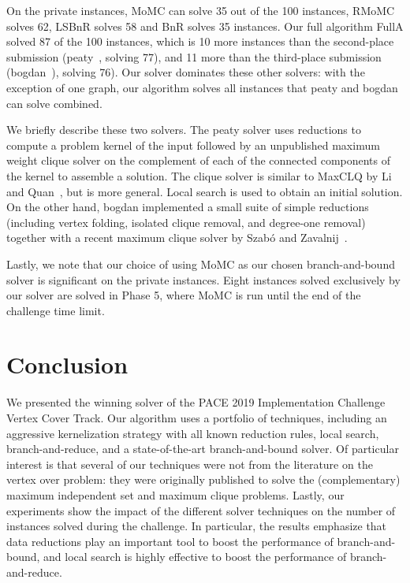 \documentclass[twoside,leqno,twocolumn]{article}
\newcommand{\AlgName}[1]{\textsf{#1}}
\begin{document}
On the private instances, \AlgName{MoMC} can solve 35 out of the 100 instances, \AlgName{RMoMC} solves 62, \AlgName{LSBnR} solves 58 and \AlgName{BnR} solves 35 instances.
Our full algorithm \AlgName{FullA} solved 87 of the 100 instances, which is 10 more instances than the second-place submission (\textsf{peaty}~\cite{james_trimble_2019_3082356}, solving 77), and 11 more than the third-place submission (\textsf{bogdan}~\cite{zbogdan_2019_3228802}), solving 76). Our solver dominates these other solvers: with the exception of one graph, our algorithm solves all instances that \textsf{peaty} and \textsf{bogdan} can solve combined. 

We briefly describe these two solvers. The \textsf{peaty} solver uses reductions to compute a problem kernel of the input followed by an unpublished maximum weight clique solver on the complement of each of the connected components of the kernel to assemble a solution. The clique solver is similar to MaxCLQ by Li and Quan~\cite{DBLP:conf/aaai/LiQ10}, but is more general. Local search is used to obtain an initial solution. On the other hand, \textsf{bogdan} implemented a small suite of simple reductions (including vertex folding, isolated clique removal, and degree-one removal) together with a recent maximum clique solver by Szab\'o and Zavalnij~\cite{szabo2018different}. 

Lastly, we note that our choice of using MoMC as our chosen branch-and-bound solver is significant on the private instances. Eight instances solved exclusively by our solver are solved in Phase 5, where MoMC is run until the end of the challenge time limit.
\vfill
\section{Conclusion}
We presented the winning solver of the PACE 2019 Implementation Challenge Vertex Cover Track. Our algorithm uses a portfolio of techniques, including an aggressive kernelization strategy with all known reduction rules, local search, branch-and-reduce, and a state-of-the-art branch-and-bound solver. Of particular interest is that several of our techniques were not from the literature on the vertex over problem: they were originally published to solve the (complementary) maximum independent set and maximum clique problems. Lastly, our experiments show the impact of the different solver techniques on the number of instances solved during the challenge. In particular, the results emphasize that data reductions play an important tool to boost the performance of branch-and-bound, and local search is highly effective to boost the performance of branch-and-reduce.
\end{document}
